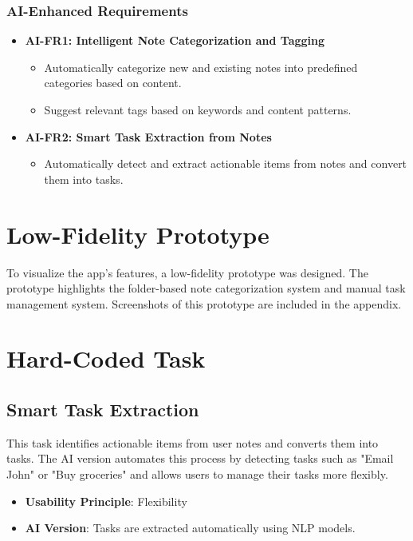 \documentclass[a4paper, 12pt]{article}
\begin{document}
\subsubsection{AI-Enhanced Requirements}
\begin{itemize}
    \item \textbf{AI-FR1: Intelligent Note Categorization and Tagging}
    \begin{itemize}
        \item Automatically categorize new and existing notes into predefined categories based on content.
        \item Suggest relevant tags based on keywords and content patterns.
    \end{itemize}
    \item \textbf{AI-FR2: Smart Task Extraction from Notes}
    \begin{itemize}
        \item Automatically detect and extract actionable items from notes and convert them into tasks.
    \end{itemize}
\end{itemize}

\section{Low-Fidelity Prototype}
To visualize the app’s features, a low-fidelity prototype was designed. The prototype highlights the folder-based note categorization system and manual task management system. Screenshots of this prototype are included in the appendix.

\section{Hard-Coded Task}
\subsection{Smart Task Extraction}
This task identifies actionable items from user notes and converts them into tasks. The AI version automates this process by detecting tasks such as "Email John" or "Buy groceries" and allows users to manage their tasks more flexibly.
\begin{itemize}
    \item \textbf{Usability Principle}: Flexibility
    \item \textbf{AI Version}: Tasks are extracted automatically using NLP models.
\end{itemize}
\end{document}
